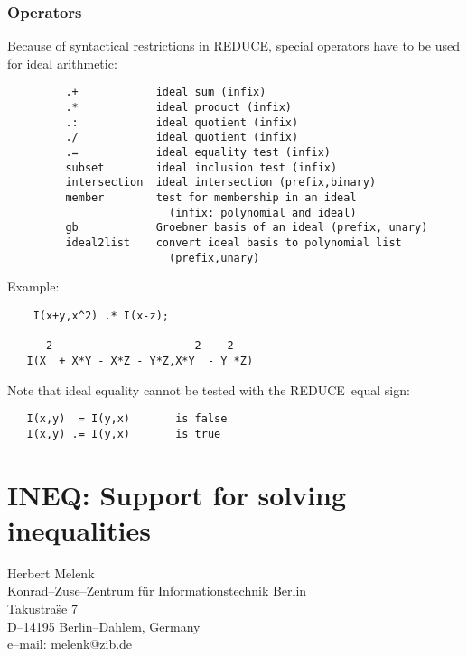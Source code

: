 \documentclass[11pt,letterpaper]{book}
\newcommand{\REDUCE}{REDUCE}
\begin{document}
\subsection{Operators}

Because of syntactical restrictions in \REDUCE, special operators
have to be used for ideal arithmetic:

{\small\begin{verbatim}
         .+            ideal sum (infix)
         .*            ideal product (infix)
         .:            ideal quotient (infix)
         ./            ideal quotient (infix)
         .=            ideal equality test (infix)
         subset        ideal inclusion test (infix)
         intersection  ideal intersection (prefix,binary)
         member        test for membership in an ideal
                         (infix: polynomial and ideal)
         gb            Groebner basis of an ideal (prefix, unary)
         ideal2list    convert ideal basis to polynomial list
                         (prefix,unary)
\end{verbatim}}

Example:

{\small\begin{verbatim}
    I(x+y,x^2) .* I(x-z);

      2                      2    2
   I(X  + X*Y - X*Z - Y*Z,X*Y  - Y *Z)
\end{verbatim}}

Note that ideal equality cannot be tested with the \REDUCE\ equal sign:
{\small\begin{verbatim}
   I(x,y)  = I(y,x)       is false
   I(x,y) .= I(y,x)       is true
\end{verbatim}}

\chapter{INEQ: Support for solving inequalities}
\label{INEQ}

{\footnotesize
\begin{center}
Herbert Melenk \\
Konrad--Zuse--Zentrum f\"ur Informationstechnik Berlin \\
Takustra\"se 7 \\
D--14195 Berlin--Dahlem, Germany \\[0.05in]
e--mail: melenk@zib.de
\end{center}
}
\end{document}
